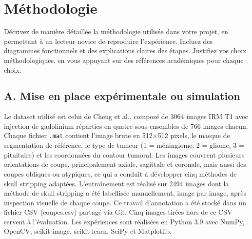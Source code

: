 \documentclass[conference]{IEEEtran}
\begin{document}
\section{Méthodologie}
Décrivez de manière détaillée la méthodologie utilisée dans votre projet, en permettant à un lecteur novice de reproduire l'expérience. Incluez des diagrammes fonctionnels et des explications claires des étapes. Justifiez vos choix méthodologiques, en vous appuyant sur des références académiques pour chaque choix.

\subsection{A. Mise en place expérimentale ou simulation}
Le dataset utilisé est celui de Cheng et al., composé de 3064 images 
IRM T1 avec injection de gadolinium réparties en quatre sous-ensembles 
de 766 images chacun. Chaque fichier \texttt{.mat} contient l'image 
brute en 512$\times$512 pixels, le masque de segmentation de référence, 
le type de tumeur (1 = méningiome, 2 = gliome, 3 = pituitaire) et les 
coordonnées du contour tumoral. Les images couvrent plusieurs 
orientations de coupe, principalement axiale, sagittale et coronale, 
mais aussi des coupes obliques ou atypiques, ce qui a conduit à 
développer cinq méthodes de skull stripping adaptées. L'entraînement 
est réalisé sur 2494 images dont la méthode de skull stripping a été 
labellisée manuellement, image par image, après inspection visuelle de chaque coupe. Ce travail 
d'annotation a été stocké dans un fichier CSV (coupes.csv) partagé via Git. 
Cinq images tirées hors de ce CSV servent à l'évaluation. Les 
expériences sont réalisées en Python 3.9 avec NumPy, OpenCV, 
scikit-image, scikit-learn, SciPy et Matplotlib.
\end{document}
